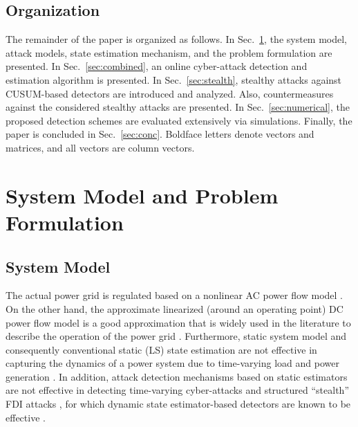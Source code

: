 \documentclass[onecolumn]{IEEEtran}
\begin{document}
\subsection{Organization}

The remainder of the paper is organized as follows. In Sec.~\ref{sec:system}, the system model, attack models, state estimation mechanism, and the problem formulation are presented. In Sec.~\ref{sec:combined}, an online cyber-attack detection and estimation algorithm is presented. In Sec.~\ref{sec:stealth}, stealthy attacks against CUSUM-based detectors are introduced and analyzed. Also, countermeasures against the considered stealthy attacks are presented. In Sec.~\ref{sec:numerical}, the proposed detection schemes are evaluated extensively via simulations. Finally, the paper is concluded in Sec.~\ref{sec:conc}. Boldface letters denote vectors and matrices, and all vectors are column vectors.


\section{System Model and Problem Formulation} \label{sec:system}

\subsection{System Model}

The actual power grid is regulated based on a nonlinear AC power flow model \cite{Liang16}. On the other hand, the approximate linearized (around an operating point) DC power flow model is a good approximation that is widely used in the literature to describe the operation of the power grid \cite{Abur04,Liu09,Cui12}. Furthermore, static system model and consequently conventional static (LS) state estimation are not effective in capturing the dynamics of a power system due to time-varying load and power generation \cite{Tan17}. In addition, attack detection mechanisms based on static estimators are not effective in detecting time-varying cyber-attacks and {structured ``stealth'' FDI attacks \cite{Liu09}, for which dynamic state estimator-based detectors are known to be effective \cite{Necip18,Zhao17}.}
\end{document}
